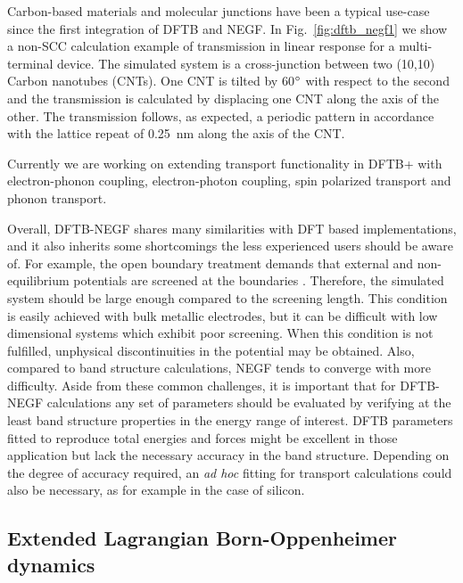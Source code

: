 \documentclass[reprint,onecolumn,superscriptaddress]{revtex4-1}
\newcommand{\dftbp}{DFTB+}
\begin{document}
Carbon-based materials and molecular junctions have been a typical use-case
since the first integration of DFTB and NEGF.\cite{reimers2007, latessa2005,
  penazzi2013} In Fig.~\ref{fig:dftb_negf1} we show a non-SCC calculation
example of transmission in linear response for a multi-terminal device. The
simulated system is a cross-junction between two (10,10) Carbon nanotubes
(CNTs). One CNT is tilted by 60$\degree$ with respect to the second and the
transmission is calculated by displacing one CNT along the axis of the other. The transmission follows, as expected, a periodic pattern in accordance with
the lattice repeat of 0.25~nm along the axis of the CNT.

Currently we are working on extending transport functionality in \dftbp{} with
electron-phonon coupling,\cite{pecchia2004b, pecchia2007, penazzi2016,
  gagliardi2008} electron-photon coupling, spin polarized transport and phonon
transport.\cite{medrano15b, medrano16, Martinez19, MedranoRev}

Overall, DFTB-NEGF shares many similarities with DFT based implementations, and
it also inherits some shortcomings the less experienced users should be aware
of. For example, the open boundary treatment demands that external and
non-equilibrium potentials are screened at the boundaries \cite{haug2008}.
Therefore, the simulated system should be large enough compared to the screening
length.  This condition is easily achieved with bulk metallic electrodes, but it
can be difficult with low dimensional systems which exhibit poor screening. When
this condition is not fulfilled, unphysical discontinuities in the potential may
be obtained. Also, compared to band structure calculations, NEGF tends to
converge with more difficulty.\cite{ozaki2010} Aside from these common
challenges, it is important that for DFTB-NEGF calculations any set of
parameters should be evaluated by verifying at the least band structure
properties in the energy range of interest. DFTB parameters fitted to reproduce
total energies and forces might be excellent in those application but lack the
necessary accuracy in the band structure. Depending on the degree of accuracy
required, an {\it ad hoc} fitting for transport calculations could also be
necessary, as for example in the case of silicon.\cite{markov2015b}

\subsection{Extended Lagrangian Born-Oppenheimer dynamics}
\end{document}
